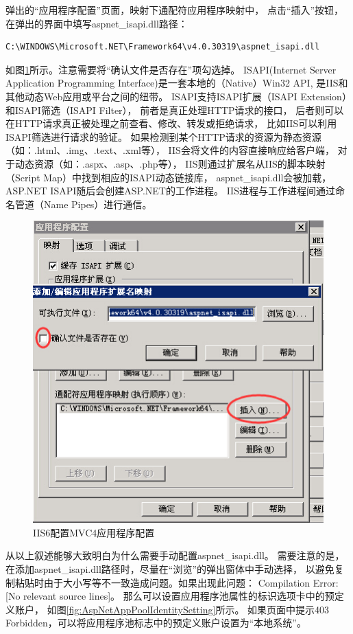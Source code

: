 \documentclass{book}
\begin{document}
弹出的“应用程序配置”页面，映射下通配符应用程序映射中，
点击“插入”按钮，在弹出的界面中填写aspnet\_isapi.dll路径：

\begin{lstlisting}
C:\WINDOWS\Microsoft.NET\Framework64\v4.0.30319\aspnet_isapi.dll
\end{lstlisting}

如图\ref{fig:IIS6MVC4AppConfig}所示。注意需要将“确认文件是否存在”项勾选掉。
ISAPI(Internet Server Application Programming Interface)是一套本地的（Native）Win32 API,
是IIS和其他动态Web应用或平台之间的纽带。
ISAPI支持ISAPI扩展（ISAPI Extension）和ISAPI筛选（ISAPI Filter），
前者是真正处理HTTP请求的接口，
后者则可以在HTTP请求真正被处理之前查看、修改、转发或拒绝请求，
比如IIS可以利用ISAPI筛选进行请求的验证。
如果检测到某个HTTP请求的资源为静态资源（如：.html、.img、.text、.xml等），
IIS会将文件的内容直接响应给客户端，
对于动态资源（如：.aspx、.asp、.php等），
IIS则通过扩展名从IIS的脚本映射（Script Map）中找到相应的ISAPI动态链接库，
aspnet\_isapi.dll会被加载，
ASP.NET ISAPI随后会创建ASP.NET的工作进程。
IIS进程与工作进程间通过命名管道（Name Pipes）进行通信\cite{蒋金楠MVC框架揭秘}。

\begin{figure}[htbp]
	\centering
	\includegraphics[scale=0.8]{IIS6MVC4AppConfig.jpg}
	\caption{IIS6配置MVC4应用程序配置}
	\label{fig:IIS6MVC4AppConfig}
\end{figure}

从以上叙述能够大致明白为什么需要手动配置aspnet\_isapi.dll。
需要注意的是，在添加aspnet\_isapi.dll路径时，尽量在“浏览”的弹出窗体中手动选择，
以避免复制粘贴时由于大小写等不一致造成问题。如果出现此问题：
Compilation Error: [No relevant source lines]。
那么可以设置应用程序池属性的标识选项卡中的预定义账户，
如图\ref{fig:AspNetAppPoolIdentitySetting}所示。
如果页面中提示403 Forbidden，可以将应用程序池标志中的预定义账户设置为“本地系统”。
\end{document}
